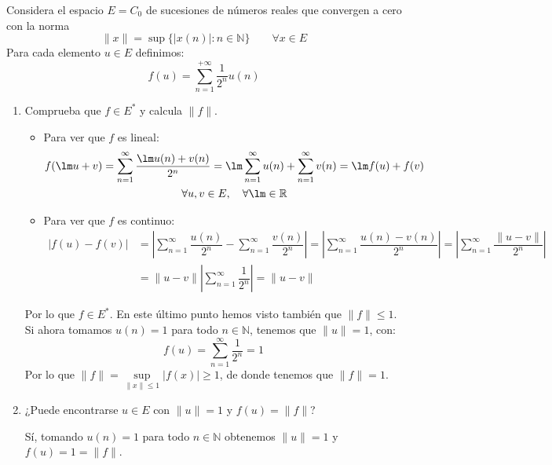 \begin{ejercicio}
    Considera el espacio $E=C_0$ de sucesiones de números reales que convergen a cero con la norma 
    \begin{equation*}
        \|x\| = \sup\{|x(n)| : n\in \mathbb{N}\} \qquad \forall x\in E
    \end{equation*}
    Para cada elemento $u\in E$ definimos:
    \begin{equation*}
        f(u) = \sum_{n=1}^{+\infty}\dfrac{1}{2^n}u(n)
    \end{equation*}
    \begin{enumerate}[label=\alph*)]
        \item Comprueba que $f\in E^\ast$ y calcula $\|f\|$.

            \begin{itemize}
                \item Para ver que $f$ es lineal:
                    \begin{multline*}
                        f(\lm u + v) = \sum_{n=1}^{\infty} \dfrac{\lm u(n)+v(n)}{2^n} = \lm \sum_{n=1}^{\infty}u(n) + \sum_{n=1}^{\infty}v(n) = \lm f(u)+f(v) \\ \forall u,v\in E, \quad \forall \lm\in \mathbb{R}
                    \end{multline*}
                \item Para ver que $f$ es continuo:
                    \begin{align*}
                        |f(u)-f(v)| &= \left|\sum_{n=1}^{\infty}\dfrac{u(n)}{2^n} - \sum_{n=1}^{\infty}\dfrac{v(n)}{2^n}\right| = \left|\sum_{n=1}^{\infty}\dfrac{u(n)-v(n)}{2^n}\right| = \left|\sum_{n=1}^{\infty}\dfrac{\|u-v\|}{2^n}\right| \\ &= \|u-v\| \left|\sum_{n=1}^{\infty}\dfrac{1}{2^n}\right| = \|u-v\|
                    \end{align*}
            \end{itemize}
            Por lo que $f\in E^\ast$. En este último punto hemos visto también que $\|f\|\leq 1$. Si ahora tomamos $u(n) = 1$ para todo $n\in \mathbb{N}$, tenemos que $\|u\|=1$, con:
            \begin{equation*}
                f(u) = \sum_{n=1}^{\infty} \dfrac{1}{2^n} = 1
            \end{equation*}
            Por lo que $\|f\|=\sup\limits_{\|x\|\leq 1}|f(x)| \geq 1$, de donde tenemos que $\|f\| = 1$.
        \item ¿Puede encontrarse $u\in E$ con $\|u\| = 1$ y $f(u) = \|f\|$?

            Sí, tomando $u(n) = 1$ para todo $n\in \mathbb{N}$ obtenemos $\|u\| =1$ y $f(u) = 1 = \|f\|$.
    \end{enumerate}
\end{ejercicio}

